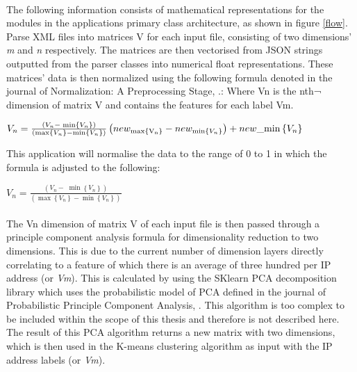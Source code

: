 \paragraph{}The following information consists of mathematical representations for the modules in the applications primary class architecture, as shown in figure \ref{flow}.
Parse XML files into matrices V for each input file, consisting of two dimensions’ \textit{m} and \textit{n} respectively. The matrices are then vectorised from JSON strings outputted from the parser classes into numerical float representations.
These matrices' data is then normalized using the following formula denoted in the journal of Normalization: A Preprocessing Stage, \cite{normalization}.:
Where Vn is the nth¬ dimension of matrix V and contains the features for each label Vm.

${V_n} = \frac{{({V_n} - \;\min \left\{ {{V_n}} \right\})}}{{\left( {\max \left\{ {{V_n}} \right\} - \min \left\{ {{V_n}} \right\}} \right)}}\left( {ne{w_{\max \left\{ {{{\rm{V}}_{\rm{n}}}} \right\}}} - ne{w_{{\rm{min}}\left\{ {{V_n}} \right\}}}} \right) + new\_{\rm{min}}\left\{ {{V_n}} \right\}$%

This application will normalise the data to the range of 0 to 1 in which the formula is adjusted to the following:

${V_n} = \frac{{({V_n} - \;\min \left\{ {{V_n}} \right\})}}{{\left( {\max \left\{ {{V_n}} \right\} - \min \left\{ {{V_n}} \right\}} \right)}}$%


\paragraph{}The Vn dimension of matrix V of each input file is then passed through a principle component analysis formula for dimensionality reduction to two dimensions. This is due to the current number of dimension layers directly correlating to a feature of which there is an average of three hundred per IP address (or \textit{Vm}). This is calculated by using the SKlearn PCA decomposition library which uses the probabilistic model of PCA defined in the journal of Probabilistic Principle Component Analysis, \cite{probabilityPCA}. This algorithm is too complex to be included within the scope of this thesis and therefore is not described here. The result of this PCA algorithm returns a new matrix with two dimensions, which is then used in the K-means clustering algorithm as input with the IP address labels (or \textit{Vm}).


